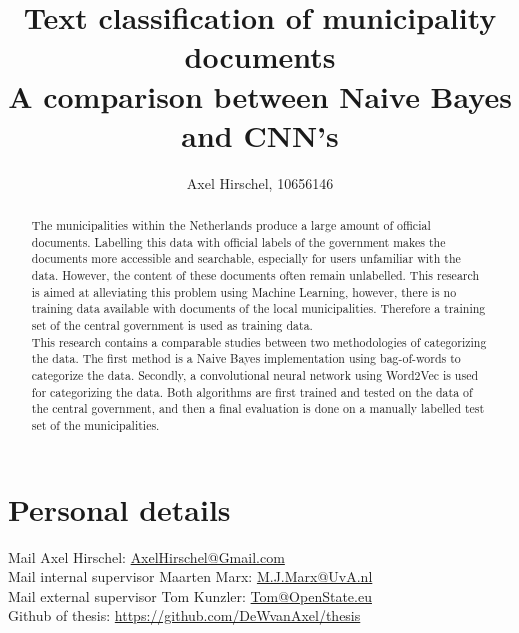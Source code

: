 \documentclass[a4paper]{article}
\begin{document}
\title{Text classification of municipality documents\\
A comparison between Naive Bayes and CNN's} %
\author{Axel Hirschel, 10656146}

\maketitle

\begin{abstract}
The municipalities within the Netherlands produce a large amount of official documents. Labelling this data with official labels of the government makes the documents more accessible and searchable, especially for users unfamiliar with the data. However, the content of these documents often remain unlabelled. This research is aimed at alleviating this problem using Machine Learning, however, there is no training data available with documents of the local municipalities. Therefore a training set of the central government is used as training data.\\
This research contains a comparable studies between two methodologies of categorizing the data. The first method is a Naive Bayes implementation using bag-of-words to categorize the data. Secondly, a convolutional neural network using Word2Vec is used for categorizing the data. Both algorithms are first trained and tested on the data of the central government, and then a final evaluation is done on a manually labelled test set of the municipalities.
\end{abstract}

\section{Personal details}
Mail Axel Hirschel: \href{mailto:AxelHirschel@gmail.com}{AxelHirschel@Gmail.com}\\
Mail internal supervisor Maarten Marx: \href{mailto:m.j.marx@uva.nl}{M.J.Marx@UvA.nl}\\
Mail external supervisor Tom Kunzler: \href{mailto:tom@openstate.eu}{Tom@OpenState.eu}\\
Github of thesis: \url{https://github.com/DeWvanAxel/thesis}
\end{document}
